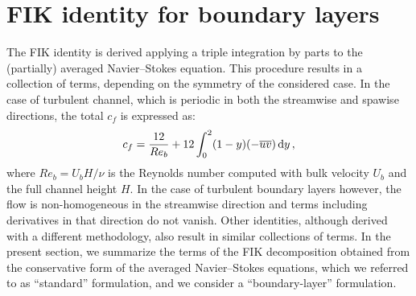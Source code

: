 \section{FIK identity for boundary layers}
The FIK identity is derived applying a triple integration by parts to the (partially) averaged Navier--Stokes equation\cite{fuka02}. This procedure results in a collection of terms, depending on the symmetry of the considered case. In the case of turbulent channel, which is periodic in both the streamwise and spawise directions, the total $c_f$ is expressed as:
\begin{equation}
    c_f = \frac{12}{Re_b} + 12 \int_0^2 (1-y) (-\overline{uv})\,{\rm d} y\,,
\end{equation}
where $Re_b=U_b H/\nu$ is the Reynolds number computed with bulk velocity $U_b$ and the full channel height $H$. 
In the case of turbulent boundary layers however, the flow is non-homogeneous in the streamwise direction and terms including derivatives in that direction do not vanish. Other identities, although derived with a different methodology, also result in similar collections of terms. In the present section, we summarize the terms of the FIK decomposition obtained from the conservative form of the averaged Navier--Stokes equations, which we referred to as ``standard'' formulation, and we consider a ``boundary-layer'' formulation. 

